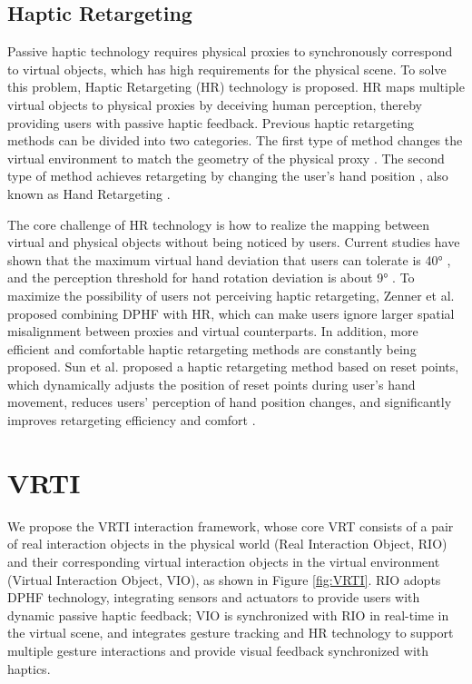 \documentclass[runningheads]{llncs}
\begin{document}
\subsection{Haptic Retargeting}
Passive haptic technology requires physical proxies to synchronously correspond to virtual objects, which has high requirements for the physical scene. To solve this problem, Haptic Retargeting (HR) technology is proposed. HR maps multiple virtual objects to physical proxies by deceiving human perception, thereby providing users with passive haptic feedback. Previous haptic retargeting methods can be divided into two categories. The first type of method changes the virtual environment to match the geometry of the physical proxy \cite{zenner2017shifty,10.1145/2858036.2858226}. The second type of method achieves retargeting by changing the user's hand position \cite{zenner2019estimating,hartfill2021analysis}, also known as Hand Retargeting \cite{zenner2021hart}.

The core challenge of HR technology is how to realize the mapping between virtual and physical objects without being noticed by users. Current studies have shown that the maximum virtual hand deviation that users can tolerate is 40° \cite{10.1145/3025453.3025753}, and the perception threshold for hand rotation deviation is about 9° \cite{zenner2019estimating}. To maximize the possibility of users not perceiving haptic retargeting, Zenner et al. proposed combining DPHF with HR, which can make users ignore larger spatial misalignment between proxies and virtual counterparts. In addition, more efficient and comfortable haptic retargeting methods are constantly being proposed. Sun et al. proposed a haptic retargeting method based on reset points, which dynamically adjusts the position of reset points during user's hand movement, reduces users' perception of hand position changes, and significantly improves retargeting efficiency and comfort \cite{10816517}.

\section{VRTI}
We propose the VRTI interaction framework, whose core VRT consists of a pair of real interaction objects in the physical world (Real Interaction Object, RIO) and their corresponding virtual interaction objects in the virtual environment (Virtual Interaction Object, VIO), as shown in Figure \ref{fig:VRTI}. RIO adopts DPHF technology, integrating sensors and actuators to provide users with dynamic passive haptic feedback; VIO is synchronized with RIO in real-time in the virtual scene, and integrates gesture tracking and HR technology to support multiple gesture interactions and provide visual feedback synchronized with haptics.
\end{document}
